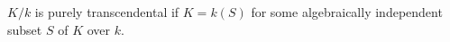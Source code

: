 $K/k$ is purely transcendental if $K = k(S)$ for some algebraically independent subset $S$ of $K$ over $k$.
